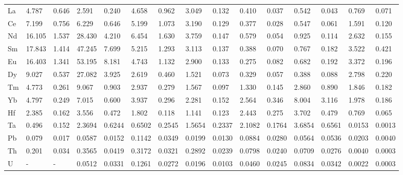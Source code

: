 \documentclass[final,authoryear,3p,times,twocolumn]{elsarticle}
\begin{document}
\begin{table}[htpb]
\begin{adjustbox}{max width=\textwidth}
\begin{tabular}{@{}lllllllllllllll@{}}
La & 4.787  & 0.646  & 2.591  & 0.240  & 4.658  & 0.962  & 3.049  & 0.132  & 0.410  & 0.037  & 0.542          & 0.043          & 0.769            & 0.071           \\
Ce & 7.199  & 0.756  & 6.229  & 0.646  & 5.199  & 1.073  & 3.190  & 0.129  & 0.377  & 0.028  & 0.547          & 0.061          & 1.591            & 0.120           \\
Nd & 16.105 & 1.537  & 28.430 & 4.210  & 6.454  & 1.630  & 3.759  & 0.147  & 0.579  & 0.054  & 0.925          & 0.114          & 2.632            & 0.155           \\
Sm & 17.843 & 1.414  & 47.245 & 7.699  & 5.215  & 1.293  & 3.113  & 0.137  & 0.388  & 0.070  & 0.767          & 0.182          & 3.522            & 0.421           \\
Eu & 16.403 & 1.341  & 53.195 & 8.181  & 4.743  & 1.132  & 2.900  & 0.133  & 0.275  & 0.082  & 0.682          & 0.192          & 3.372            & 0.196           \\
Dy & 9.027  & 0.537  & 27.082 & 3.925  & 2.619  & 0.460  & 1.521  & 0.073  & 0.329  & 0.057  & 0.388          & 0.088          & 2.798            & 0.220           \\
Tm & 4.773  & 0.261  & 9.067  & 0.903  & 2.937  & 0.279  & 1.567  & 0.097  & 1.330  & 0.145  & 2.860          & 0.890          & 1.846            & 0.182           \\
Yb & 4.797  & 0.249  & 7.015  & 0.600  & 3.937  & 0.296  & 2.281  & 0.152  & 2.564  & 0.346  & 8.004          & 3.116          & 1.978            & 0.186           \\
Hf & 2.385  & 0.162  & 3.556  & 0.472  & 1.802  & 0.118  & 1.141  & 0.123  & 2.443  & 0.275  & 3.702          & 0.479          & 0.769            & 0.065           \\
Ta & 0.496  & 0.152  & 2.3694 & 0.6244 & 0.6502 & 0.2545 & 1.5654 & 0.2337 & 2.1082 & 0.1764 & 3.6854         & 0.6561         & 0.0153           & 0.0013          \\
Pb & 0.079  & 0.017  & 0.0587 & 0.0152 & 0.1142 & 0.0349 & 0.0199 & 0.0130 & 0.0884 & 0.0280 & 0.0564         & 0.0536         & 0.0203           & 0.0040          \\
Th & 0.201  & 0.034  & 0.3565 & 0.0419 & 0.3172 & 0.0321 & 0.2892 & 0.0239 & 0.0798 & 0.0240 & 0.0709         & 0.0276         & 0.0040           & 0.0003          \\
U  & -      & -      & 0.0512 & 0.0331 & 0.1261 & 0.0272 & 0.0196 & 0.0103 & 0.0460 & 0.0245 & 0.0834         & 0.0342         & 0.0022           & 0.0003          \\ \bottomrule
\end{tabular}
\end{adjustbox}
\end{table}
\end{document}

